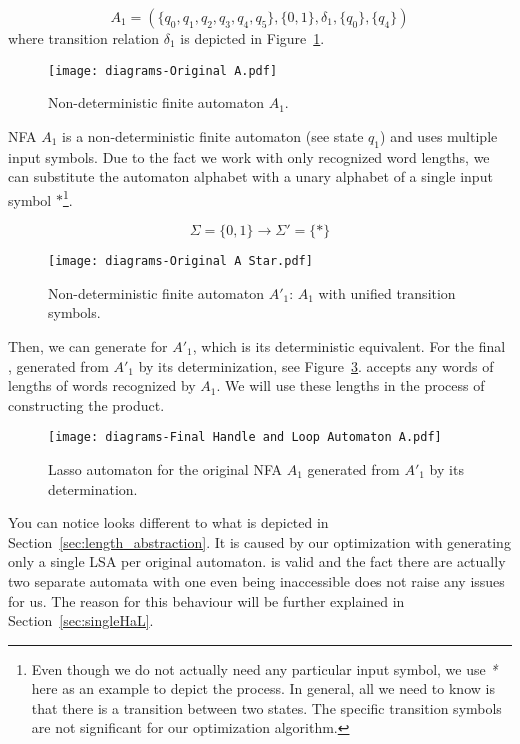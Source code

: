 $$ A_1 = (\{q_0, q_1, q_2, q_3, q_4, q_5\}, \{0, 1\}, \delta_1, \{q_0\}, \{q_4\}) $$
where transition relation $\delta_1$ is depicted in Figure~\ref{fig:NFA_A1_orig}.

\begin{figure}[ht]
	\centering
	\texttt{[image: diagrams-Original A.pdf]}
	\caption{Non-deterministic finite automaton $A_1$.}
	\label{fig:NFA_A1_orig}
\end{figure}

NFA $A_1$ is a non-deterministic finite automaton (see state $q_1$) and uses multiple input symbols. Due to the fact we work with only recognized word lengths, we can substitute the automaton alphabet with a unary alphabet of a single input symbol $*$\footnote{Even though we do not actually need any particular input symbol, we use \emph{*} here as an example to depict the process. In general, all we need to know is that there is a transition between two states. The specific transition symbols are not significant for our optimization algorithm.}.

$$\Sigma = \{0, 1\} \longrightarrow \Sigma' = \{*\} $$

\begin{figure}[ht]
	\centering
	\texttt{[image: diagrams-Original A Star.pdf]}
	\caption{Non-deterministic finite automaton $A'_1$: $A_1$ with unified transition symbols.}
	\label{fig:NFA_A1_star}
\end{figure}

Then, we can generate  for $A'_1$, which is its deterministic equivalent. For the final , generated from $A'_1$ by its determinization, see Figure~\ref{fig:HaL_A1}.  accepts any words of lengths of words recognized by $A_1$. We will use these lengths in the process of constructing the product.

\begin{figure}[ht]
	\centering
	\texttt{[image: diagrams-Final Handle and Loop Automaton A.pdf]}
	\caption{Lasso automaton  for the original NFA $A_1$ generated from $A'_1$ by its determination.}
	\label{fig:HaL_A1}
\end{figure}

You can notice  looks different to what is depicted in Section~\ref{sec:length_abstraction}. It is caused by our optimization with generating only a single LSA per original automaton.  is valid and the fact there are actually two separate automata with one even being inaccessible does not raise any issues for us. The reason for this behaviour will be further explained in Section~\ref{sec:singleHaL}.

